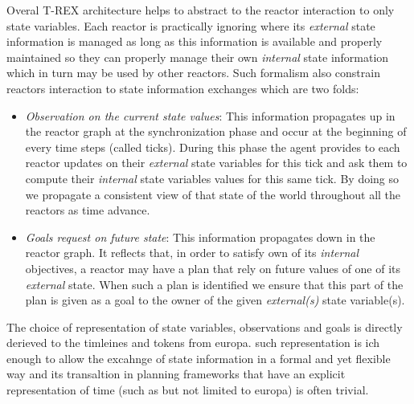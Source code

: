 Overal T-REX architecture helps to abstract to the reactor interaction
to only state variables. Each reactor is practically ignoring where
its {\em external} state information is managed as long as this
information is available and properly maintained so they can properly 
manage their own {\em internal} state information which in turn may be
used by other reactors. Such formalism also constrain reactors
interaction to state information exchanges which are two folds:
\begin{itemize}
\item {\em Observation on the current state values}: This information
  propagates up in the reactor graph at the synchronization phase 
  and occur at the beginning of every time steps (called
  ticks). During this phase the agent provides to each reactor 
  updates on their {\em external} state variables for this tick and
  ask them to compute their {\em internal} state variables values for
  this same tick. By doing so we propagate a consistent view of that
  state of the world throughout all the reactors as time advance.
\item {\em Goals request on future state}: This information propagates
  down in the reactor graph. It reflects that, in order to satisfy own
  of its {\em internal} objectives, a reactor may have a plan that
  rely on future values of one of its {\em external} state. When such
  a plan is identified we ensure that this part of the plan is given
  as a goal to the owner of the given {\em external(s)} state variable(s). 
\end{itemize}

The choice of representation of state variables, observations and
goals is directly derieved to the timleines and tokens from europa. 
such representation is ich enough to allow the excahnge of state
information in a formal and yet flexible way and its transaltion in
planning frameworks that have an explicit representation of time 
(such as but not limited to europa) is often trivial. 


